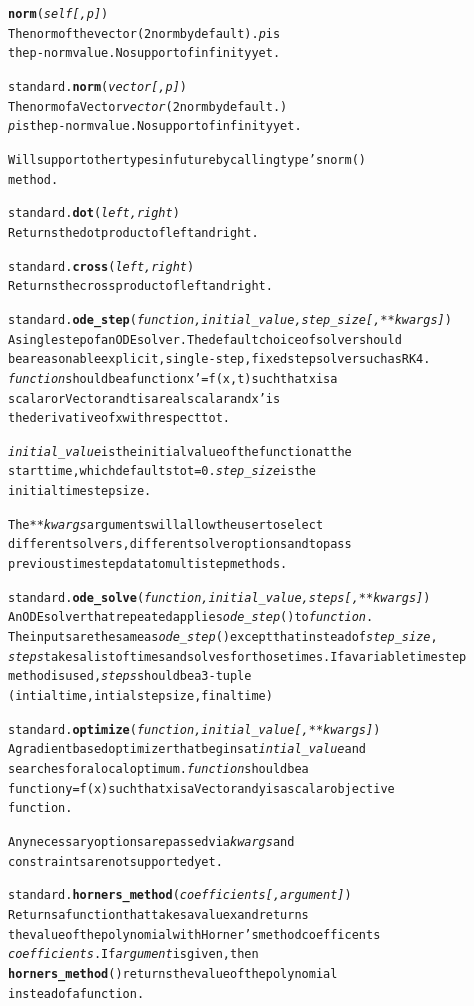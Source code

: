 \documentclass{book}
\begin{document}
\begin{alltt}
    \textbf{norm}(\emph{self[,p]})
        The norm of the vector (2 norm by default). \emph{p} is
         the p-norm value. No support of infinity yet.

standard.\textbf{norm}(\emph{ vector[,p]})
    The norm of a Vector \emph{vector} (2 norm by default.)
    \emph{p} is the p-norm value. No support of infinity yet.

    Will support other types in future by calling type's norm()
    method.

standard.\textbf{dot}(\emph{ left,right})
    Returns the dot product of left and right.

standard.\textbf{cross}(\emph{ left,right})
    Returns the cross product of left and right.

standard.\textbf{ode_step}(\emph{function, initial_value, step_size[, **kwargs]})
    A single step of an ODE solver. The default choice of solver should 
    be a reasonable explicit, single-step, fixed step solver such as RK4. 
    \emph{function} should be a  function x'=f( x,t ) such that x is a 
    scalar or Vector and t is a real scalar and x' is
    the derivative of x with respect to t.

    \emph{initial_value} is the initial value of the function at the
     start time, which defaults to t=0. \emph{step_size} is the 
     initial time step size. 

    The \emph{**kwargs} arguments will allow the user to select
    different solvers, different solver options and to pass 
    previous time step data to multistep methods.

standard.\textbf{ode_solve}(\emph{function, initial_value, steps[, **kwargs]})
    An ODE solver that repeated applies \emph{ode_step}() to \emph{function}.
    The inputs are the same as \emph{ode_step}() except that instead of \emph{step_size},
    \emph{steps} takes a list of times and solves for those times. If a variable time step 
    method is used, \emph{steps} should be a 3-tuple 
    (intial time, intial step size, final time)

standard.\textbf{optimize}(\emph{function, initial_value[, **kwargs]})
    A gradient based optimizer that begins at \emph{intial_value} and 
    searches for a local optimum. \emph{function} should be a
    function y=f( x ) such that x is a Vector and y is a scalar objective 
    function.

    Any necessary options are passed via \emph{kwargs} and
    constraints are not supported yet.

standard.\textbf{horners_method}(\emph{coefficients[, argument]})
    Returns a function that takes a value x and returns 
    the value of the polynomial with Horner's method coefficents
    \emph{coefficients}. If \emph{argument} is given, then 
    \textbf{horners_method}() returns the value of the polynomial
    instead of a function.


\end{alltt}
\end{document}
